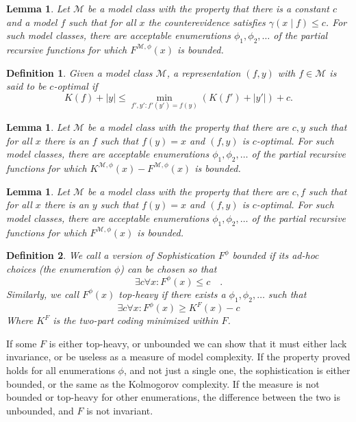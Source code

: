 \documentclass{article}
\newtheorem{lemma}[theorem]{Lemma}
\newtheorem{definition}{Definition}
\newcommand{\M}{\mathcal M}
\newcommand{\p}{\quad\text{.}}
\begin{document}
\begin{lemma}
  Let $\M$ be a model class with the property that there is a constant $c$ and a model $f$ such that for all $x$ the counterevidence satisfies $\gamma(x\mid f)\le c$.
  For such model classes, there are acceptable enumerations $\phi_1,\phi_2,\ldots$ of the partial recursive functions for which $F^{\M,\phi}(x)$ is bounded.
\end{lemma}







\begin{definition}
  Given a model class $\M$, a representation $(f,y)$ with $f\in\M$ is said to be \emph{$c$-optimal} if
\[
K(f)+|y|\le \min_{f',y':f'(y')=f(y)}\left(K(f')+|y'|\right)+c.
\]
\end{definition}

\begin{lemma}
  Let $\M$ be a model class with the property that there are $c,y$ such that for all $x$ there is an $f$ such that $f(y)=x$ and $(f,y)$ is $c$-optimal.
  For such model classes, there are acceptable enumerations $\phi_1,\phi_2,\ldots$ of the partial recursive functions for which $K^{\M,\phi}(x)-F^{\M,\phi}(x)$ is bounded.
\end{lemma}

\begin{lemma}
  Let $\M$ be a model class with the property that there are $c,f$ such that for all $x$ there is an $y$ such that $f(y)=x$ and $(f,y)$ is $c$-optimal.
For such model classes, there are acceptable enumerations $\phi_1,\phi_2,\ldots$ of the partial recursive functions for which $F^{\M,\phi}(x)$ is bounded.
\end{lemma}





\begin{definition}
We call a version of Sophistication $F^\phi$ \emph{bounded} if its ad-hoc choices (the enumeration $\phi$) can be chosen so that
\[
	\exists c \forall x: F^\phi(x) \leq c \p
\]
Similarly, we call $F^\phi(x)$ \emph{top-heavy} if there exists a $\phi_1, \phi_2, \ldots$ such that
\[
	\exists c \forall x: F^\phi(x) \geq K^F(x) - c 
\]
Where $K^F$ is the two-part coding minimized within $F$.
\end{definition}

If some $F$ is either top-heavy, or unbounded we can show that it must either lack invariance, or be useless as a measure of model complexity. If the property proved holds for all enumerations $\phi$, and not just a single one, the sophistication is either bounded, or the same as the Kolmogorov complexity. If the measure is not bounded or top-heavy for other enumerations, the difference between the two is unbounded, and $F$ is not invariant. 
\end{document}
